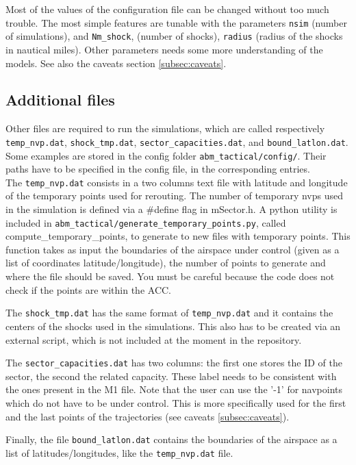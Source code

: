\documentclass[12pt]{article}
\begin{document}
Most of the values of the configuration file can be changed without too much trouble. The most simple features are tunable with the parameters \verb|nsim| (number of simulations), and \verb|Nm_shock|, (number of shocks), \verb|radius| (radius of the shocks in nautical miles). Other parameters needs some more understanding of the models. See also the caveats section \ref{subsec:caveats}.


\subsection{Additional files}
Other files are required to run the simulations, which are called respectively \verb|temp_nvp.dat|, \verb|shock_tmp.dat|,  \verb|sector_capacities.dat|, and \verb|bound_latlon.dat|. Some examples are stored in the config folder \verb|abm_tactical/config/|. Their paths have to be specified in the config file, in the corresponding entries.\\

The \verb|temp_nvp.dat| consists in a two columns text file with latitude and longitude of the temporary points used for rerouting. The number of temporary nvps used in the simulation is defined via a \#define flag in mSector.h. A python utility is included in \verb|abm_tactical/generate_temporary_points.py|, called compute\_temporary\_points, to generate to new files with temporary points. This function takes as input the boundaries of the airspace under control (given as a list of coordinates latitude/longitude), the number of points to generate and  where the file should be saved. You must be careful because the code does not check if the points are within the ACC.

The \verb|shock_tmp.dat| has the same format of \verb|temp_nvp.dat| and it contains the centers of the shocks used in the simulations. This also has to be created via an external script, which is not included at the moment in the repository.

The \verb|sector_capacities.dat| has two columns: the first one stores the ID of the sector, the second the related capacity. These label needs to be consistent with the ones present in the M1 file. Note that the user can use the '-1' for navpoints which do not have to be under control. This is more specifically used for the first and the last points of the trajectories (see caveats \ref{subsec:caveats}).

Finally, the file \verb|bound_latlon.dat| contains the boundaries of the airspace as a list of latitudes/longitudes, like the \verb|temp_nvp.dat| file.
\end{document}
